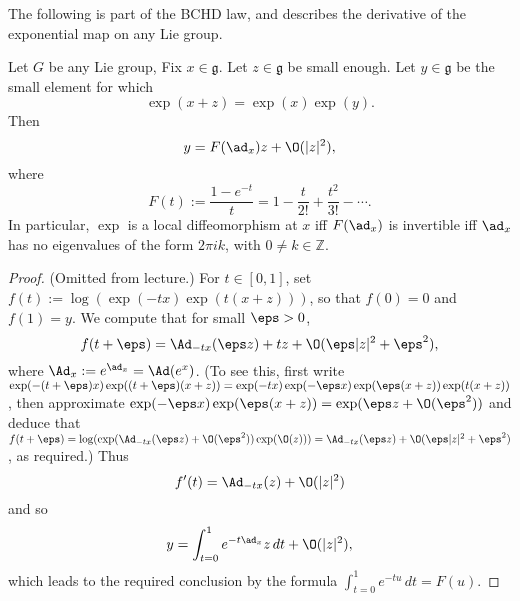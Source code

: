\documentclass[reqno]{amsart} 
\begin{document}
The following is part of the BCHD law, and describes the derivative of the exponential map on any Lie group.
\begin{lemma}\label{lem:deriv-of-expo}
  Let $G$ be any Lie group, Fix $x \in \mathfrak{g}$.  Let $z \in \mathfrak{g}$ be small enough.  Let $y \in \mathfrak{g}$ be the small element for which
  \begin{equation}\label{eq:}
    \exp(x + z) = \exp(x) \exp(y).
  \end{equation}
  Then
  \begin{equation}\label{eq:}
    y = F(\ad_x) z + \O(|z|^2),
  \end{equation}
  where
  \begin{equation}\label{eq:}
    F(t) := \frac{1 - e^{-t }}{t}
    = 1 - \frac{t}{2!}
    + \frac{t^2}{3!} - \dotsb.
  \end{equation}
  In particular, $\exp$ is a local diffeomorphism at $x$ iff $F(\ad_x)$ is invertible iff $\ad_x$ has no eigenvalues of the form $2 \pi i k$, with $0 \neq k \in \mathbb{Z}$.
\end{lemma}
\begin{proof}
  (Omitted from lecture.)  For $t \in [0,1]$, set $f(t) := \log (\exp(-t x) \exp(t (x+z)))$, so that $f(0) = 0$ and $f(1) = y$.  We compute that for small $\eps > 0$,
  \begin{equation}\label{eq:}
    f(t + \eps)
    = \Ad_{-t x} (\eps z) + t z + \O(\eps |z|^2 + \eps^2),
  \end{equation}
  where $\Ad_x := e^{\ad_x} = \Ad(e^x)$.  (To see this, first write $\exp(-(t + \eps) x) \exp((t+\eps)(x+z)) = \exp(-t x) \exp(-\eps x) \exp(\eps(x+z)) \exp(t(x+z))$, then approximate $\exp(-\eps x) \exp(\eps(x+z)) = \exp(\eps z + \O(\eps^2))$ and deduce that $f(t+\eps) = \log(\exp(\Ad_{-t x}(\eps z) + \O(\eps^2)) \exp(\O(z))) = \Ad_{-t x}(\eps z) + \O(\eps |z|^2 + \eps^2)$, as required.)  Thus
  \begin{equation*}
    f'(t) = \Ad_{-t x}(z) + \O(|z|^2)
  \end{equation*}
  and so
  \begin{equation*}
    y = \int_{t = 0}^{1} e^{-t \ad_x} z \, d t + \O(|z|^2),
  \end{equation*}
  which leads to the required conclusion by the formula $\int_{t=0}^1 e^{-t u} \, d t = F(u)$.
\end{proof}
\end{document}
